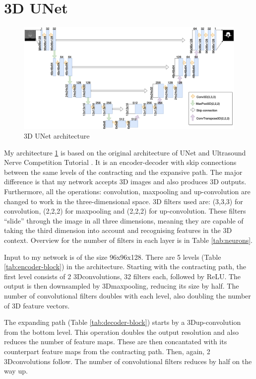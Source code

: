 \section{3D UNet}
\begin{figure}[ht!]
    \centering
    \includegraphics[width=1.\textwidth]{images/unet3d.png}
    \caption{3D UNet architecture}
    \label{fig:3D-unet}
\end{figure}

My architecture \ref{fig:3D-unet} is based on the original architecture of UNet \cite{unet2015} and Ultrasound Nerve Competition Tutorial \cite{jocic}. It is an encoder-decoder with skip connections between the same levels  of the contracting and the expansive path. The major difference is that my network accepts 3D images and also produces 3D outputs. Furthermore, all the operations: convolution, maxpooling and up-convolution are changed to work in the three-dimensional space. 3D filters used are: (3,3,3) for convolution, (2,2,2) for maxpooling and (2,2,2) for up-convolution. These filters ``slide'' through the image in all three dimensions, meaning they are capable of taking the third dimension into account and recognising features in the 3D context. Overview for the number of filters in each layer is in Table \ref{tab:neurons}.

Input to my network is of the size 96x96x128. There are 5 levels (Table \ref{tab:encoder-block}) in the architecture. Starting with the contracting path, the first level consists of 2 3Dconvolutions, 32 filters each, followed by ReLU. The output is then downsampled by 3Dmaxpooling, reducing its size by half. The number of convolutional filters doubles with each level, also doubling the number of 3D feature vectors. 

The expanding path (Table \ref{tab:decoder-block}) starts by a 3Dup-convolution from the bottom level. This operation doubles the output resolution and also reduces the number of feature maps. These are then concantated with its counterpart feature maps from the contracting path. Then, again, 2 3Dconvolutions follow. The number of convolutional filters reduces by half on the way up. 

